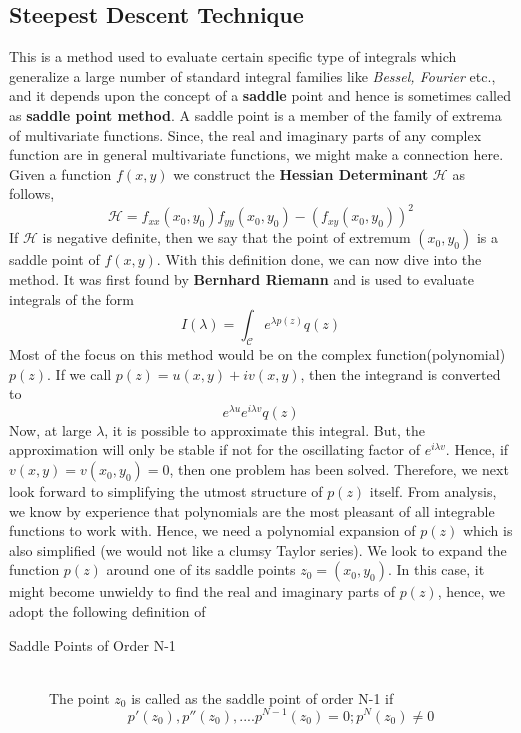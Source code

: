 \documentclass[11pt]{article}
\begin{document}
\begin{sloppypar}
\subsection{Steepest Descent Technique}
This is a method used to evaluate certain specific type of integrals which generalize a large number of standard integral families like \textit{Bessel, Fourier} etc., and it depends upon the concept of a \textbf{saddle} point and hence is sometimes called as \textbf{saddle point method}. A saddle point is a member of the family of extrema of multivariate functions. Since, the real and imaginary parts of any complex function are in general multivariate functions, we might make a connection here. Given a function $f(x,y)$ we construct the \textbf{Hessian Determinant} $\mathcal{H}$ as follows,
$$\mathcal{H} = f_{xx}(x_0,y_0)f_{yy}(x_0,y_0)-(f_{xy}(x_0,y_0))^2$$
If $\mathcal{H}$ is negative definite, then we say that the point of extremum $(x_0,y_0)$ is a saddle point of $f(x,y)$. With this definition done, we can now dive into the method. It was first found by \textbf{Bernhard Riemann} and is used to evaluate integrals of the form $$I(\lambda) = \int_{\mathcal{C}}e^{\lambda p(z)}q(z)$$ Most of the focus on this method would be on the complex function(polynomial) $p(z)$. If we call $p(z) = u(x,y)+iv(x,y)$, then the integrand is converted to $$e^{\lambda u}e^{i\lambda v}q(z)$$ Now, at large $\lambda$, it is possible to approximate this integral. But, the approximation will only be stable if not for the oscillating factor of $e^{i\lambda v}$. Hence, if $v(x,y) = v(x_0,y_0) = 0$, then one problem has been solved. Therefore, we next look forward to simplifying the utmost structure of $p(z)$ itself. From analysis, we know by experience that polynomials are the most pleasant of all integrable functions to work with. Hence, we need a polynomial expansion of $p(z)$ which is also simplified (we would not like a clumsy Taylor series). We look to expand the function $p(z)$ around one of its saddle points $z_0 = (x_0, y_0)$. In this case, it might become unwieldy to find the real and imaginary parts of $p(z)$, hence, we adopt the following definition of 
\begin{description}
\item[Saddle Points of Order N-1] \hfill \\
	The point $z_0$ is called as the saddle point of order N-1 if $$p'(z_0),p''(z_0),....p^{N-1}(z_0)=0;  p^{N}(z_0) \neq 0$$
\end{description}


\end{sloppypar}
\end{document}

